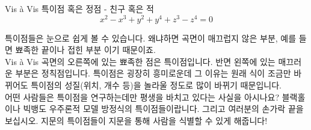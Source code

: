 \begin{surferPage}{Vis \`a Vis}
특이점 혹은 정점 - 친구 혹은 적\\
\smallskip
\[x^2	- x^3+ y^2+ y^4+ z^3- z^4	=  0\]

\vspace{0.3cm}
특이점들은 눈으로 쉽게 볼 수 있습니다. 왜냐하면 곡면이 매끄럽지 않은 부분, 예를 들면 뾰족한 끝이나 접힌 부분 이기 때문이죠. \\
\vspace{0.3cm}
Vis \`a Vis 곡면의 오른쪽에 있는 뾰족한 점은 특이점입니다. 반면 왼쪽에 있는 매끄러운 부분은 정칙점입니다. 특이점은 굉장히 흥미로운데 그 이유는 원래 식이 조금만 바뀌어도 특이점의 성질(위치, 개수 등)을  놀라울 정도로 많이 바뀌기 때문입니다. \\

\vspace{0.3cm}
어떤 사람들은 특이점을 연구하는데만 평생을 바치고 있다는 사실을 아시나요? 블랙홀이나 빅뱅도 우주론적 모델 방정식의 특이점들이랍니다. 그리고 여러분의 손가락 끝을 보십시오. 지문의 특이점들이 지문을 통해 사람을 식별할 수 있게 해줍니다!
\end{surferPage}
